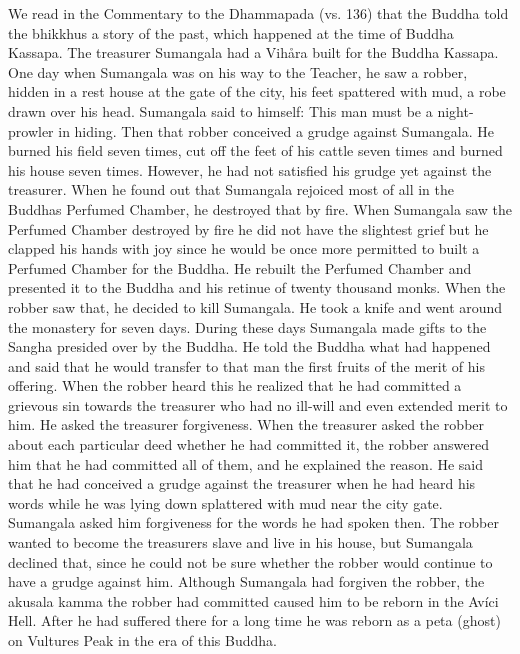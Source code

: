 \documentclass[12pt,twoside]{article}
\begin{document}
We read in the Commentary to the Dhammapada (vs. 136) that the Buddha
told the bhikkhus a story of the past, which happened at the time of
Buddha Kassapa. The treasurer Sumangala had a Vih{\aa}ra built for the
Buddha Kassapa. One day when Sumangala was on his way to the Teacher,
he saw a robber, hidden in a rest house at the gate of the city, his
feet spattered with mud, a robe drawn over his head. Sumangala said to
himself: {\textasciigrave}{\textasciigrave}This man must be a
night{}-prowler in hiding.{\textquotesingle}{\textquotesingle} Then
that robber conceived a grudge against Sumangala. He burned his field
seven times, cut off the feet of his cattle seven times and burned his
house seven times. However, he had not satisfied his grudge yet against
the treasurer. When he found out that Sumangala rejoiced most of all in
the Buddha{\textquotesingle}s Perfumed Chamber, he destroyed that by
fire. When Sumangala saw the Perfumed Chamber destroyed by fire he did
not have the slightest grief but he clapped his hands with joy since he
would be once more permitted to built a Perfumed Chamber for the
Buddha. He rebuilt the Perfumed Chamber and presented it to the Buddha
and his retinue of twenty thousand monks. When the robber saw that, he
decided to kill Sumangala. He took a knife and went around the
monastery for seven days. During these days Sumangala made gifts to the
Sangha presided over by the Buddha. He told the Buddha what had
happened and said that he would transfer to that man the first fruits
of the merit of his offering. When the robber heard this he realized
that he had committed a grievous sin towards the treasurer who had no
ill{}-will and even extended merit to him. He asked the treasurer
forgiveness. When the treasurer asked the robber about each particular
deed whether he had committed it, the robber answered him that he had
committed all of them, and he explained the reason. He said that he had
conceived a grudge against the treasurer when he had heard his words
while he was lying down splattered with mud near the city gate.
Sumangala asked him forgiveness for the words he had spoken then. The
robber wanted to become the treasurer{\textquotesingle}s slave and live
in his house, but Sumangala declined that, since he could not be sure
whether the robber would continue to have a grudge against him.
Although Sumangala had forgiven the robber, the akusala kamma the
robber had committed caused him to be reborn in the Av\'ici Hell. After
he had suffered there for a long time he was reborn as a peta (ghost)
on Vultures Peak in the era of this Buddha. 
\end{document}
